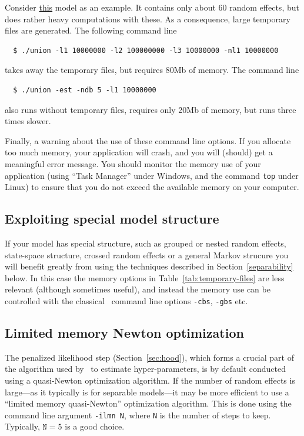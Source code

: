 \documentclass{admbmanual}
\begin{document}
Consider \href{http://www.admb-project.org/otter-research/admbre/examples/union/union.html}{this}
model as an example. It contains only about 60 random effects, but does rather
heavy computations with these. As a consequence, large temporary files are
generated. The following command line
\begin{lstlisting}
  $ ./union -l1 10000000 -l2 100000000 -l3 10000000 -nl1 10000000
\end{lstlisting}
takes away the temporary files, but requires 80Mb of memory. The command line
\begin{lstlisting}
  $ ./union -est -ndb 5 -l1 10000000
\end{lstlisting}
also runs without temporary files, requires only 20Mb of memory, but runs three
times slower.

Finally, a warning about the use of these command line options. If you allocate
too much memory, your application will crash, and you will (should) get a
meaningful error message. You should monitor the memory use of your application
(using ``Task Manager'' under Windows, and the command \texttt{top} under Linux)
to ensure that you do not exceed the available memory on your computer.

\subsection{Exploiting special model structure}
If your model has special structure, such as
grouped or nested random effects, state-space structure,
crossed random effects or a general Markov strucure
you will benefit greatly from using the techniques
described in Section~\ref{separability} below.
In this case the memory options in Table~\ref{tab:temporary-files}
are less relevant (although sometimes useful), and instead the
memory use can be controlled with the classical \ADM\ command line options
\texttt{-cbs}, \texttt{-gbs} etc.

\subsection{Limited memory Newton optimization}

The penalized likelihood step (Section~\ref{sec:hood}), which forms a crucial
part of the algorithm used by \scAB\ to estimate hyper-parameters, is by default
conducted using a quasi-Newton optimization algorithm. If the number of random
effects is large---as it typically is for separable models---it may be more
efficient to use a ``limited memory quasi-Newton'' optimization algorithm. This
is done using the command line argument \texttt{-ilmn N}, where \texttt{N} is
the number of steps to keep. Typically, $\texttt{N} = 5$ is a good choice.
\end{document}
